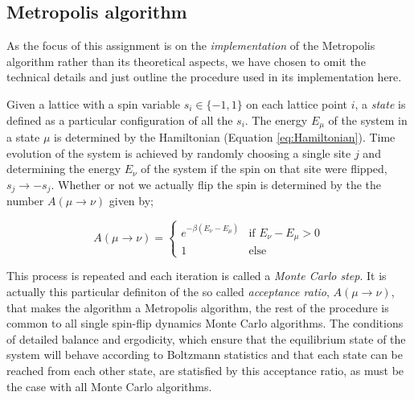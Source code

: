 \documentclass[11pt,a4paper]{article}
\begin{document}


\subsection{Metropolis algorithm}
As the focus of this assignment is on the \textit{implementation} of the Metropolis algorithm rather than its theoretical
 aspects, we have chosen to omit the technical details and just outline the procedure used in its implementation here.

 Given a
 lattice with a spin variable $s_i \in \{-1,1\}$ on each lattice point $i$, a \textit{state} is defined as a particular
 configuration of all the ${s_i}$. The energy $E_\mu$ of the system in a state $\mu$ is determined by the Hamiltonian
 (Equation \ref{eq:Hamiltonian}). Time evolution of the system is achieved by randomly choosing a single site $j$ and determining
 the energy $E_\nu$ of the system if the spin on that site were flipped, $s_j \rightarrow -s_j$. Whether or not we actually flip
 the spin is determined by the the number $A(\mu \rightarrow \nu)$ given by;


\begin{equation}\label{eq:A-ratio}
    A(\mu \rightarrow \nu) = \begin{cases}
        e^{-\beta (E_\nu - E_\mu)} & \mbox{if} \,\,  E_\nu - E_\mu > 0 \\
        1 & \mbox{else}
    \end{cases}
\end{equation}

This process is repeated and each iteration is called a \textit{Monte Carlo step}.
 It is actually this particular definiton of the so called
 \textit{acceptance ratio}, $A(\mu \rightarrow \nu)$, that makes the algorithm a Metropolis algorithm,
 the rest of the procedure is common to all single spin-flip dynamics Monte Carlo algorithms. The conditions
 of detailed balance and ergodicity, which ensure that the
 equilibrium state of the system will behave according to Boltzmann statistics and that each state can be reached from each other state, are
 statisfied by this acceptance ratio, as must be the case with all Monte Carlo algorithms.


\end{document}
